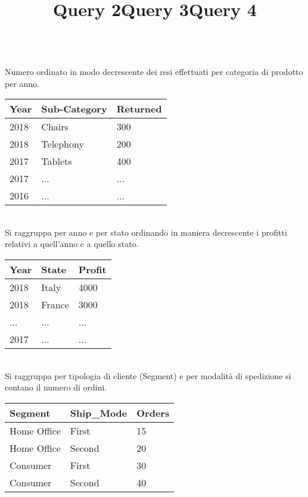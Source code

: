 \documentclass[11pt,a4paper]{article}
\begin{document}
\title{\textbf{Query 2}}\\
Numero ordinato in modo decrescente dei resi effettuati per categoria di prodotto per anno.
\begin{center}
	\begin{table}[h!]
		\begin{tabular}{|l|l|l|}
			\hline
			Year & Sub-Category & Returned \\ \hline
			2018 & Chairs        & 300      \\ \hline
			2018 & Telephony    & 200      \\ \hline
			2017 & Tablets       & 400      \\ \hline
			2017 & ...          & ...      \\ \hline
			2016 & ...          & ...      \\ \hline
		\end{tabular}
	\end{table}
\end{center}
\title{\textbf{Query 3}}\\
Si raggruppa per anno e per stato ordinando in maniera decrescente i profitti relativi a quell'anno e a quello stato.
	\begin{table}[h!]
	\begin{tabular}{|l|l|l|}
		\hline
		Year & State   & Profit \\ \hline
		2018 & Italy  & 4000\EUR   \\ \hline
		2018 & France & 3000\EUR   \\ \hline
		...  & ...     & ...    \\ \hline
		2017 & ...     & ...    \\ \hline
	\end{tabular}
\end{table}
\newpage
\title{\textbf{Query 4}}\\
Si raggruppa per tipologia di cliente (Segment) e per modalità di spedizione si contano il numero di ordini.
	\begin{table}[h!]
	\begin{tabular}{|l|l|l|}
		\hline
		Segment     & Ship\_Mode & Orders \\ \hline
		Home Office & First      & 15     \\ \hline
		Home Office & Second     & 20     \\ \hline
		Consumer    & First      & 30     \\ \hline
		Consumer    & Second     & 40     \\ \hline
	\end{tabular}
\end{table}
\end{document}
